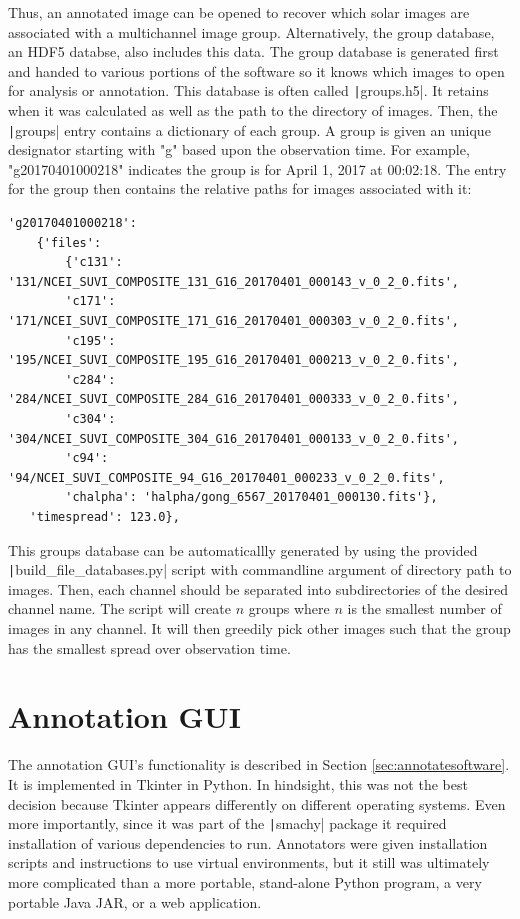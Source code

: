 \documentclass[twoside]{report}
\newcommand{\code}[1]{\texttt|#1|}
\begin{document}
Thus, an annotated image can be opened to recover which solar images are associated with a multichannel image group. Alternatively, the group database, an HDF5 databse, also includes this data. The group database is generated first and handed to various portions of the software so it knows which images to open for analysis or annotation. This database is often called \code{groups.h5}. It retains when it was calculated as well as the path to the directory of images. Then, the \code{groups} entry contains a dictionary of each group. A group is given an unique designator starting with "g" based upon the observation time. For example, "g20170401000218" indicates the group is for April 1, 2017 at 00:02:18. The entry for the group then contains the relative paths for images associated with it: 
\begin{verbatim}
'g20170401000218': 
    {'files': 
        {'c131': '131/NCEI_SUVI_COMPOSITE_131_G16_20170401_000143_v_0_2_0.fits',
        'c171': '171/NCEI_SUVI_COMPOSITE_171_G16_20170401_000303_v_0_2_0.fits',
        'c195': '195/NCEI_SUVI_COMPOSITE_195_G16_20170401_000213_v_0_2_0.fits',
        'c284': '284/NCEI_SUVI_COMPOSITE_284_G16_20170401_000333_v_0_2_0.fits',
        'c304': '304/NCEI_SUVI_COMPOSITE_304_G16_20170401_000133_v_0_2_0.fits',
        'c94': '94/NCEI_SUVI_COMPOSITE_94_G16_20170401_000233_v_0_2_0.fits',
        'chalpha': 'halpha/gong_6567_20170401_000130.fits'},
   'timespread': 123.0},
\end{verbatim}
This groups database can be automaticallly generated by using the provided \code{build_file_databases.py} script with commandline argument of directory path to images. Then, each channel should be separated into subdirectories of the desired channel name. The script will create $n$ groups where $n$ is the smallest number of images in any channel. It will then greedily pick other images such that the group has the smallest spread over observation time. 

\section{Annotation GUI}
The annotation GUI's functionality is described in Section \ref{sec:annotatesoftware}. It is implemented in Tkinter in Python. In hindsight, this was not the best decision because Tkinter appears differently on different operating systems. Even more importantly, since it was part of the \code{smachy} package it required installation of various dependencies to run. Annotators were given installation scripts and instructions to use virtual environments, but it still was ultimately more complicated than a more portable, stand-alone Python program, a very portable Java JAR, or a web application. 
\end{document}
